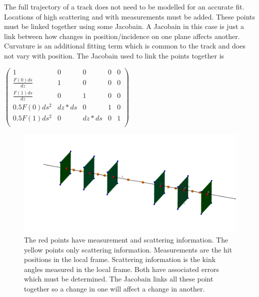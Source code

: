 The full trajectory of a track does not need to be modelled for an accurate fit. Locations of high scattering and with measurements must be added. These points must be linked together using some Jacobain. A Jacobain in this case is just a link between how changes in position/incidence on one plane affects another. Curvature is an additional fitting term which is common to the track and does not vary with position. The Jacobain used to link the points together is 


\begin{center}
$
 \left( \begin{array}{cccccc}
1                            & 0       & 0        & 0 & 0  \\
\frac{F(0)ds}{dz} & 1        & 0        & 0 & 0  \\
\frac{F(1)ds}{dz} & 0        & 1        & 0 & 0  \\
0.5F(0)ds^2        & dz*ds & 0        & 1 & 0      \\  
0.5F(1)ds^2        & 0        & dz*ds & 0 &  1       \\  
  \label{eq:PC}
\end{array}
 \right)
$
\end{center}

\begin{figure}[H]
\centering
\includegraphics[width=1.0\linewidth]{figures/meas-scat-jac-link.png}
\caption{The red points have measurement and scattering information. The yellow points only scattering information. Measurements are the hit positions in the local frame. Scattering information is the kink angles measured in the local frame. Both have associated errors which must be determined. The Jacobain links all these point together so a change in one will affect a change in another.}
\label{fig:LinkJac}
\end{figure}


